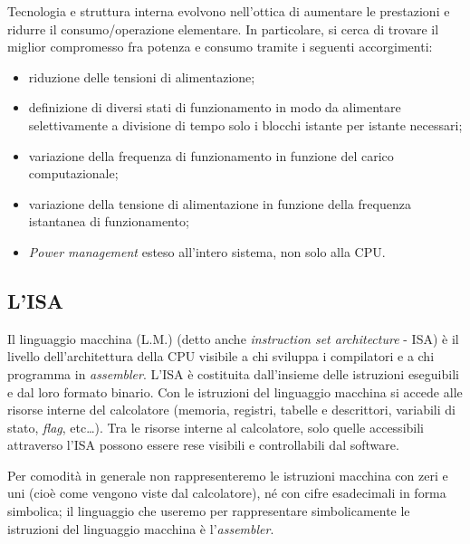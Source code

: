 Tecnologia e struttura interna evolvono nell'ottica di aumentare le prestazioni e ridurre il consumo/operazione
elementare. In particolare, si cerca di trovare il miglior compromesso fra potenza e consumo tramite i seguenti accorgimenti:
\begin{itemize}
\item riduzione delle tensioni di alimentazione;
\item definizione di diversi stati di funzionamento in modo da
alimentare selettivamente a divisione di tempo solo i blocchi
istante per istante necessari;
\item variazione della frequenza di funzionamento in funzione del
carico computazionale;
\item variazione della tensione di alimentazione in funzione della
frequenza istantanea di funzionamento;
\item \textit{Power management} esteso all'intero sistema, non solo alla
CPU.
\end{itemize}


\subsection{L'ISA}
\label{sec:isa}

Il linguaggio macchina (L.M.) (detto anche \textit{instruction set architecture} - ISA) è il livello dell'architettura della CPU visibile a chi sviluppa i compilatori e a chi programma in \textit{assembler}. L'ISA è costituita dall'insieme delle istruzioni eseguibili e dal loro formato binario. Con le istruzioni del linguaggio macchina si accede alle risorse interne del calcolatore (memoria, registri, tabelle e descrittori, variabili di stato, \textit{flag}, etc\ldots). Tra le risorse interne al calcolatore, solo quelle accessibili attraverso l'ISA possono essere rese visibili e controllabili dal software.

Per comodità in generale non rappresenteremo le istruzioni macchina con zeri e uni (cioè come vengono viste dal calcolatore), né con cifre esadecimali in forma simbolica; il linguaggio che useremo per rappresentare simbolicamente le istruzioni del linguaggio macchina è l'\textit{assembler}.

